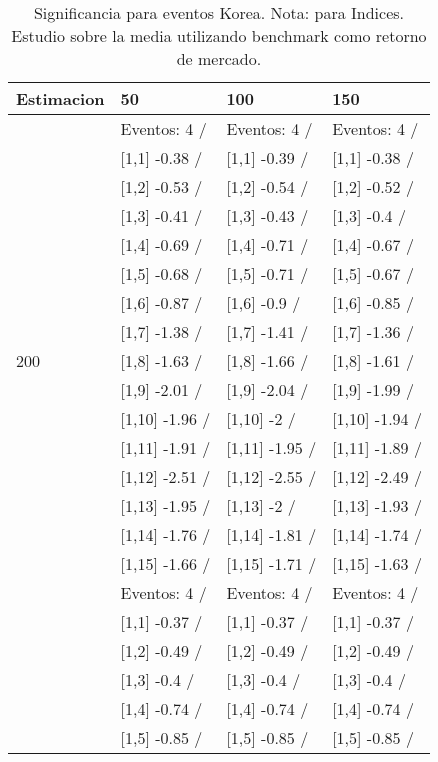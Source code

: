 \begin{table}

\caption{Significancia para eventos Korea. Nota: para Indices. Estudio sobre la media utilizando benchmark como retorno de mercado.}
\centering
\begin{tabular}[t]{llll}
\toprule
Estimacion & 50 & 100 & 150\\
\midrule
 & Eventos:  4 / & Eventos:  4 / & Eventos:  4 /\\
 & {}[1,1] -0.38  / & {}[1,1] -0.39  / & {}[1,1] -0.38  /\\
 & {}[1,2] -0.53  / & {}[1,2] -0.54  / & {}[1,2] -0.52  /\\
 & {}[1,3] -0.41  / & {}[1,3] -0.43  / & {}[1,3] -0.4  /\\
 & {}[1,4] -0.69  / & {}[1,4] -0.71  / & {}[1,4] -0.67  /\\
\addlinespace
 & {}[1,5] -0.68  / & {}[1,5] -0.71  / & {}[1,5] -0.67  /\\
 & {}[1,6] -0.87  / & {}[1,6] -0.9  / & {}[1,6] -0.85  /\\
 & {}[1,7] -1.38  / & {}[1,7] -1.41  / & {}[1,7] -1.36  /\\
200 & {}[1,8] -1.63  / & {}[1,8] -1.66  / & {}[1,8] -1.61  /\\
 & {}[1,9] -2.01  / & {}[1,9] -2.04  / & {}[1,9] -1.99  /\\
\addlinespace
 & {}[1,10] -1.96  / & {}[1,10] -2  / & {}[1,10] -1.94  /\\
 & {}[1,11] -1.91  / & {}[1,11] -1.95  / & {}[1,11] -1.89  /\\
 & {}[1,12] -2.51  / & {}[1,12] -2.55  / & {}[1,12] -2.49  /\\
 & {}[1,13] -1.95  / & {}[1,13] -2  / & {}[1,13] -1.93  /\\
 & {}[1,14] -1.76  / & {}[1,14] -1.81  / & {}[1,14] -1.74  /\\
\addlinespace
 & {}[1,15] -1.66  / & {}[1,15] -1.71  / & {}[1,15] -1.63  /\\
 & Eventos:  4 / & Eventos:  4 / & Eventos:  4 /\\
 & {}[1,1] -0.37  / & {}[1,1] -0.37  / & {}[1,1] -0.37  /\\
 & {}[1,2] -0.49  / & {}[1,2] -0.49  / & {}[1,2] -0.49  /\\
 & {}[1,3] -0.4  / & {}[1,3] -0.4  / & {}[1,3] -0.4  /\\
\addlinespace
 & {}[1,4] -0.74  / & {}[1,4] -0.74  / & {}[1,4] -0.74  /\\
 & {}[1,5] -0.85  / & {}[1,5] -0.85  / & {}[1,5] -0.85  /\\

\end{tabular}
\end{table}
